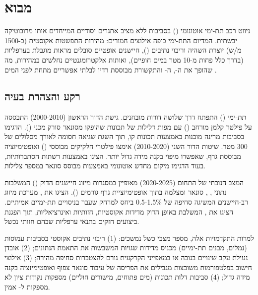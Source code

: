 
\section{מבוא}
\label{sec:introduction}

ניווט רכב תת-ימי אוטונומי () בסביבות ללא  מציב אתגרים יסודיים המייחדים אותו מרובוטיקה יבשתית. המדיום התת-ימי כופה אילוצים חמורים: מהירות התפשטות אקוסטית (כ-1500 מ\!/\!ש) יוצרת השהיה וריבוי נתיבים (), חיישנים אופטיים סובלים מראות מוגבלת בערפליות (בדרך כלל פחות מ-10 מטר במים חופיים), ואותות אלקטרומגנטיים נחלשים במהירות, מה שהופך את ה-, ה- והתקשורת מבוססת רדיו לבלתי אפשריים מתחת לפני המים \cite{Paull2014}.

\subsection{רקע והצהרת בעיה}
\label{sec:problem_statement}

 תת-ימי () התפתח דרך שלושה דורות מובחנים. גישת הדור הראשון (2000-2010) התבססה על פילטר קלמן מורחב () עם מפות דלילות של תכונות שהופקו מסונאר סורק מכני (). \citet{Ribas2008} הדגימו  בסביבות מרינה מובנות באמצעות תכונות קו, תוך השגת שגיאה חסומה לאורך מסלולים של 300 מטר. שיטות הדור השני (2010-2020) אימצו פילטרי חלקיקים מבוססי  () ואופטימיזציה מבוססת גרף, שאפשרו מיפוי בקנה מידה גדול יותר. \citet{Mallios2014} הציגו  באמצעות רשתות הסתברותיות, בעוד \citet{Fallon2013} הדגימו מיקום מחדש אוטונומי באמצעות  מבוסס סונאר במספר צלילות.

המצב הנוכחי של התחום (2020-2025) מאופיין במסגרות מיזוג חיישנים הדוק () המשלבות נתוני , , סונאר ומצלמה בתוך אופטימיזציית גרף גורמים (). \citet{Rahman2022} הציגו את , מערכת מיזוג רב-חיישנים המשיגה סחיפה של 0.5-1.5\% ביחס למרחק שעבר בניסויים תת-ימיים אמיתיים. \citet{Chen2023} הציגו את , המשלבת באופן הדוק מדידות אקוסטיות, חזותיות ואינרציאליות, תוך הפגנת ביצועים חזקים בתנאי ערפליות שבהם  חזותי נכשל.

למרות התקדמויות אלה, מספר מצבי כשל נמשכים: (1) ריבוי נתיבים אקוסטי בסביבות עמוסות (נמלים, מבנים תת-ימיים) מכניס מדידות שגויות המשבשות את התאמת הנתונים; (2) אובדן נעילת  עקב שינויים בגובה או במאפייני הקרקעית גורם להצטברות סחיפה מהירה; (3) אילוצי חישוב בפלטפורמות משובצות מגבילים את הפריסה של עיבוד סונאר צפוף ואופטימיזציה בקנה מידה גדול; (4) סביבות דלות תכונות (מים פתוחים, מישורים חוליים) מספקות נקודות ציון לא מספקות ל- אמין.

